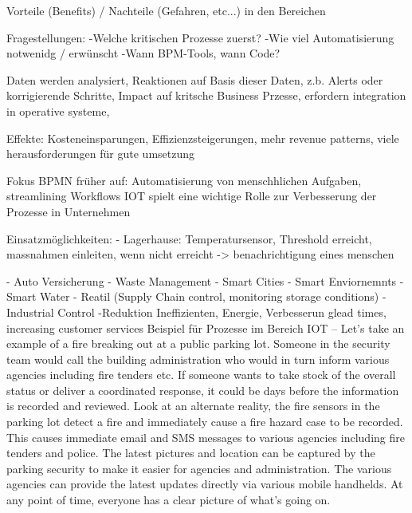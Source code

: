 Vorteile (Benefits) / Nachteile (Gefahren, etc...) in den Bereichen

Fragestellungen:
-Welche kritischen Prozesse zuerst?
-Wie viel Automatisierung notwenidg / erwünscht
-Wann BPM-Tools, wann Code?


Daten werden analysiert, Reaktionen auf Basis dieser Daten, z.b. Alerts oder korrigierende Schritte, Impact auf kritsche Business Przesse, erfordern integration in operative systeme, 

Effekte: Kosteneinsparungen, Effizienzsteigerungen, mehr revenue patterns, viele herausforderungen für gute umsetzung

Fokus BPMN früher auf: Automatisierung von menschhlichen Aufgaben, streamlining Workflows
IOT spielt eine wichtige Rolle zur Verbesserung der Prozesse in Unternehmen


Einsatzmöglichkeiten:
- Lagerhause: Temperatursensor, Threshold erreicht, massnahmen einleiten, wenn nicht erreicht -> benachrichtigung eines menschen

- Auto Versicherung
- Waste Management
- Smart Cities
- Smart Enviornemnts
- Smart Water
- Reatil (Supply Chain control, monitoring storage conditions)
-Industrial Control
-Reduktion Ineffizienten, Energie, Verbesserun glead times, increasing customer services
Beispiel für Prozesse im Bereich IOT
--
Let’s take an example of a fire breaking out at a public parking lot. Someone in the security team would call the building administration who would in turn inform various agencies including fire tenders etc. If someone wants to take stock of the overall status or deliver a coordinated response, it could be days before the information is recorded and reviewed. Look at an alternate reality, the fire sensors in the parking lot detect a fire and immediately cause a fire hazard case to be recorded. This causes immediate email and SMS messages to various agencies including fire tenders and police. The latest pictures and location can be captured by the parking security to make it easier for agencies and administration. The various agencies can provide the latest updates directly via various mobile handhelds. At any point of time, everyone has a clear picture of what’s going on.

